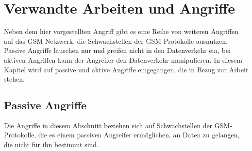 \chapter{Verwandte Arbeiten und Angriffe} \label{hdl:einleitung_stand-der-technik}

Neben dem hier vorgestellten Angriff gibt es eine Reihe von weiteren Angriffen auf das \ac{GSM}-Netzwerk, die Schwachstellen der \ac{GSM}-Protokolle ausnutzen. Passive Angriffe lauschen nur und greifen nicht in den Datenverkehr ein, bei aktiven Angriffen kann der Angreifer den Datenverkehr manipulieren. In diesem Kapitel wird auf passive und aktive Angriffe eingegangen, die in Bezug zur Arbeit stehen.

\section{Passive Angriffe} \label{hdl:passive-attacks}
Die Angriffe in diesem Abschnitt beziehen sich auf Schwachstellen der \ac{GSM}-Protokolle, die es einem passiven Angreifer ermöglichen, an Daten zu gelangen, die nicht für ihn bestimmt sind.

